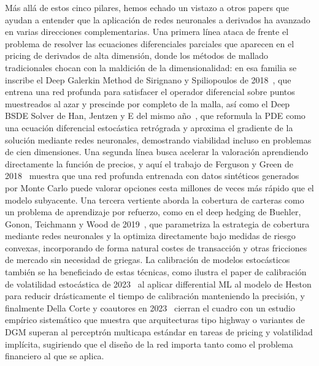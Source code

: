 \documentclass[11pt,a4paper]{article}
\begin{document}
Más allá de estos cinco pilares, hemos echado un vistazo a otros papers que ayudan a entender que la aplicación de redes neuronales a derivados ha avanzado en varias direcciones complementarias. Una primera línea ataca de frente el problema de resolver las ecuaciones diferenciales parciales que aparecen en el pricing de derivados de alta dimensión, donde los métodos de mallado tradicionales chocan con la maldición de la dimensionalidad: en esa familia se inscribe el Deep Galerkin Method de Sirignano y Spiliopoulos de 2018~\cite{sirignano2018}, que entrena una red profunda para satisfacer el operador diferencial sobre puntos muestreados al azar y prescinde por completo de la malla, así como el Deep BSDE Solver de Han, Jentzen y E del mismo año~\cite{han2018}, que reformula la PDE como una ecuación diferencial estocástica retrógrada y aproxima el gradiente de la solución mediante redes neuronales, demostrando viabilidad incluso en problemas de cien dimensiones. Una segunda línea busca acelerar la valoración aprendiendo directamente la función de precios, y aquí el trabajo de Ferguson y Green de 2018~\cite{ferguson2018} muestra que una red profunda entrenada con datos sintéticos generados por Monte Carlo puede valorar opciones cesta millones de veces más rápido que el modelo subyacente. Una tercera vertiente aborda la cobertura de carteras como un problema de aprendizaje por refuerzo, como en el deep hedging de Buehler, Gonon, Teichmann y Wood de 2019~\cite{buehler2019}, que parametriza la estrategia de cobertura mediante redes neuronales y la optimiza directamente bajo medidas de riesgo convexas, incorporando de forma natural costes de transacción y otras fricciones de mercado sin necesidad de griegas. La calibración de modelos estocásticos también se ha beneficiado de estas técnicas, como ilustra el paper de calibración de volatilidad estocástica de 2023~\cite{dlcalib2023} al aplicar differential ML al modelo de Heston para reducir drásticamente el tiempo de calibración manteniendo la precisión, y finalmente Della Corte y coautores en 2023~\cite{dellacorte2023} cierran el cuadro con un estudio empírico sistemático que muestra que arquitecturas tipo highway o variantes de DGM superan al perceptrón multicapa estándar en tareas de pricing y volatilidad implícita, sugiriendo que el diseño de la red importa tanto como el problema financiero al que se aplica.
\end{document}
